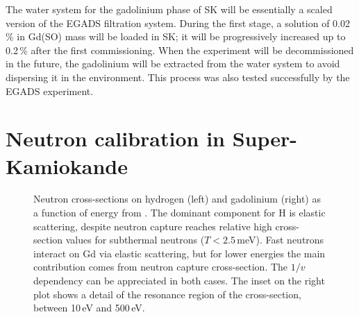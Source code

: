 The water system for the gadolinium phase of SK will be essentially a scaled version of the EGADS filtration system.
During the first stage, a solution of 0.02\,\% in Gd(SO) mass will be loaded in SK; %
it will be progressively increased up to 0.2\,\% after the first commissioning.
When the experiment will be decommissioned in the future, the gadolinium will be extracted from the water system %
to avoid dispersing it in the environment.
This process was also tested successfully by the EGADS experiment.


\section{Neutron calibration in Super-Kamiokande}
\label{sec:neutron_cal}


\begin{figure}
	\centering
	\resizebox{\linewidth}{!}{}
	\caption[Neutron cross-sections on hydrogen and gadolinium-157]%
	{Neutron cross-sections on hydrogen (left) and gadolinium (right) as a function of energy from . %
	The dominant component for H is elastic scattering, despite neutron capture %
	reaches relative high cross-section values for subthermal neutrons ($T < 2.5$\,meV).
	Fast neutrons interact on Gd via elastic scattering, but for lower energies %
	the main contribution comes from neutron capture cross-section.
	The $1/v$ dependency can be appreciated in both cases.
	The inset on the right plot shows a detail of the resonance region of the cross-section, between 10\,eV and 500\,eV.}
	\label{fig:n_xsec}
\end{figure}



